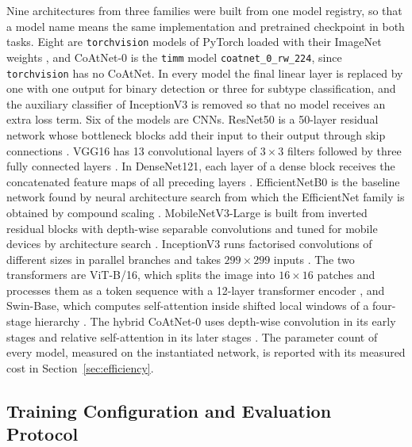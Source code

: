 \documentclass[a4paper,fleqn]{cas-sc}
\begin{document}
Nine architectures from three families were built from one model registry, so that a model name means the same implementation and pretrained checkpoint in both tasks. Eight are \texttt{torchvision} models of PyTorch \citep{paszke2019} loaded with their ImageNet weights \citep{deng2009,russakovsky2015}, and CoAtNet-0 is the \texttt{timm} model \texttt{coatnet\_0\_rw\_224}, since \texttt{torchvision} has no CoAtNet. In every model the final linear layer is replaced by one with one output for binary detection or three for subtype classification, and the auxiliary classifier of InceptionV3 is removed so that no model receives an extra loss term. Six of the models are CNNs. ResNet50 is a 50-layer residual network whose bottleneck blocks add their input to their output through skip connections \citep{he2016}. VGG16 has 13 convolutional layers of $3\times 3$ filters followed by three fully connected layers \citep{simonyan2015}. In DenseNet121, each layer of a dense block receives the concatenated feature maps of all preceding layers \citep{huang2017}. EfficientNetB0 is the baseline network found by neural architecture search from which the EfficientNet family is obtained by compound scaling \citep{tan2019}. MobileNetV3-Large is built from inverted residual blocks with depth-wise separable convolutions \citep{sandler2018} and tuned for mobile devices by architecture search \citep{howard2019}. InceptionV3 runs factorised convolutions of different sizes in parallel branches and takes $299\times 299$ inputs \citep{szegedy2016}. The two transformers are ViT-B/16, which splits the image into $16\times 16$ patches and processes them as a token sequence with a 12-layer transformer encoder \citep{dosovitskiy2021}, and Swin-Base, which computes self-attention inside shifted local windows of a four-stage hierarchy \citep{liu2021}. The hybrid CoAtNet-0 uses depth-wise convolution in its early stages and relative self-attention in its later stages \citep{dai2021}. The parameter count of every model, measured on the instantiated network, is reported with its measured cost in Section~\ref{sec:efficiency}.

\subsection{Training Configuration and Evaluation Protocol}
\label{sec:training}
\end{document}
